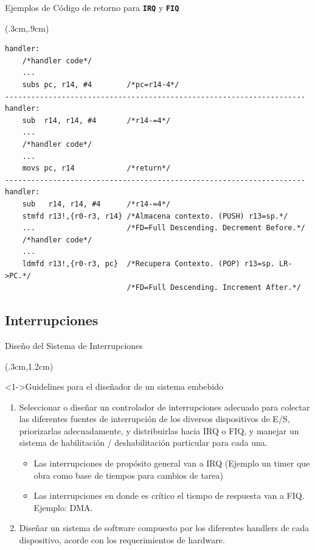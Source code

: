 \documentclass[table,x11names,aspectratio=169]{beamer}
\begin{document}
\begin{frame}[t,fragile]{Ejemplos de Código de retorno para \textbf{\texttt{IRQ}} y \texttt{\textbf{FIQ}}}
 \begin{textblock*}{\textwidth}(.3cm,.9cm)
  \lstset{language=[ARM]Assembler,basicstyle=\scriptsize,}
  \begin{lstlisting}[escapechar=\@,numbers=none, frame=single, xleftmargin=20pt, xrightmargin=0pt,]
handler:
    /*handler code*/
    ...
    subs pc, r14, #4        /*pc=r14-4*/
---------------------------------------------------------------------
handler:
    sub  r14, r14, #4       /*r14-=4*/
    ...
    /*handler code*/
    ...
    movs pc, r14            /*return*/
---------------------------------------------------------------------
handler:
    sub   r14, r14, #4      /*r14-=4*/
    stmfd r13!,{r0-r3, r14} /*Almacena contexto. (PUSH) r13=sp.*/
    ...                     /*FD=Full Descending. Decrement Before.*/
    /*handler code*/
    ...
    ldmfd r13!,{r0-r3, pc}  /*Recupera Contexto. (POP) r13=sp. LR->PC.*/
                            /*FD=Full Descending. Increment After.*/
  \end{lstlisting}
 \end{textblock*}
\end{frame}

\subsection{Interrupciones}
\begin{frame}{Diseño del Sistema de Interrupciones}
 \begin{textblock*}{\textwidth}(.3cm,1.2cm)
  \begin{block}<1->{Guidelines para el diseñador de un sistema embebido}
   \begin{enumerate}[<+(1)->] \justifying \parskip 0.3cm
    \item Seleccionar o diseñar un controlador de interrupciones adecuado para colectar las diferentes fuentes de interrupción de los diversos dispositivos de E/S, priorizarlas adecuadamente, y distribuirlas hacia IRQ o FIQ, y manejar un sistema de habilitación / deshabilitación particular para cada una.
    \begin{itemize} \justifying \parskip 0.3cm
     \item Las interrupciones de propósito general van a IRQ (Ejemplo un timer que obra como base de tiempos para cambios de tarea)
     \item Las interrupciones en donde es crítico el tiempo de respuesta van a FIQ. Ejemplo: DMA.
    \end{itemize}
    \item Diseñar un sistema de software compuesto por los diferentes handlers de cada dispositivo, acorde con los requerimientos de hardware.
   \end{enumerate}
  \end{block}
 \end{textblock*}
\end{frame}
\end{document}
